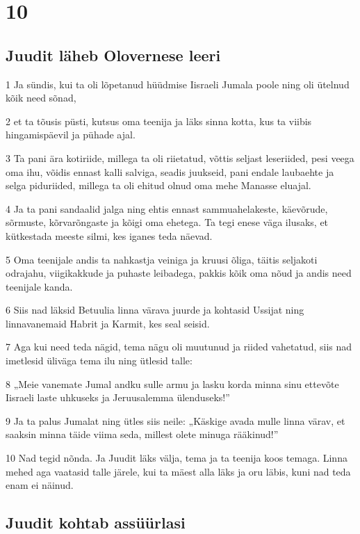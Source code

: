 \chapter{10}

\section*{Juudit läheb Olovernese leeri}

\par 1 Ja sündis, kui ta oli lõpetanud hüüdmise Iisraeli Jumala poole ning oli ütelnud kõik need sõnad,
\par 2 et ta tõusis püsti, kutsus oma teenija ja läks sinna kotta, kus ta viibis hingamispäevil ja pühade ajal.
\par 3 Ta pani ära kotiriide, millega ta oli riietatud, võttis seljast leseriided, pesi veega oma ihu, võidis ennast kalli salviga, seadis juukseid, pani endale laubaehte ja selga piduriided, millega ta oli ehitud olnud oma mehe Manasse eluajal.
\par 4 Ja ta pani sandaalid jalga ning ehtis ennast sammuahelakeste, käevõrude, sõrmuste, kõrvarõngaste ja kõigi oma ehetega. Ta tegi enese väga ilusaks, et kütkestada meeste silmi, kes iganes teda näevad.
\par 5 Oma teenijale andis ta nahkastja veiniga ja kruusi õliga, täitis seljakoti odrajahu, viigikakkude ja puhaste leibadega, pakkis kõik oma nõud ja andis need teenijale kanda.
\par 6 Siis nad läksid Betuulia linna värava juurde ja kohtasid Ussijat ning linnavanemaid Habrit ja Karmit, kes seal seisid.
\par 7 Aga kui need teda nägid, tema nägu oli muutunud ja riided vahetatud, siis nad imetlesid üliväga tema ilu ning ütlesid talle:
\par 8 „Meie vanemate Jumal andku sulle armu ja lasku korda minna sinu ettevõte Iisraeli laste uhkuseks ja Jeruusalemma ülenduseks!”
\par 9 Ja ta palus Jumalat ning ütles siis neile: „Käskige avada mulle linna värav, et saaksin minna täide viima seda, millest olete minuga rääkinud!”
\par 10 Nad tegid nõnda. Ja Juudit läks välja, tema ja ta teenija koos temaga. Linna mehed aga vaatasid talle järele, kui ta mäest alla läks ja oru läbis, kuni nad teda enam ei näinud.

\section*{Juudit kohtab assüürlasi}

